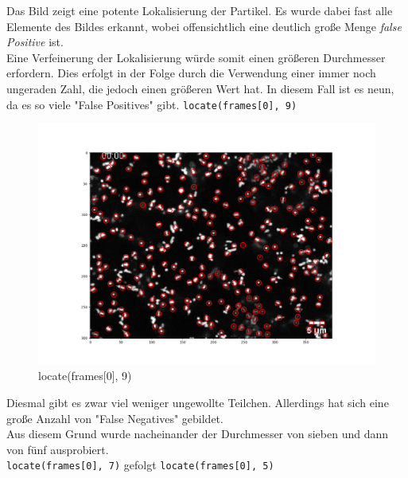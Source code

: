 \begin{enumerate}
Das Bild zeigt eine potente Lokalisierung der Partikel. Es wurde dabei fast alle Elemente des Bildes erkannt, wobei offensichtlich eine deutlich große Menge \textit{false Positive} ist. \\
Eine Verfeinerung der Lokalisierung würde somit einen größeren Durchmesser erfordern. Dies erfolgt in der Folge durch die Verwendung einer immer noch ungeraden Zahl, die jedoch einen größeren Wert hat. In diesem Fall ist es neun, da es so viele "False Positives" gibt. 
\texttt{locate(frames[0], 9)}

\begin{figure}[H]
    \centering
    \includegraphics[scale=0.35]{Grafiken/trackpyBilder/locate(frames[0], 9).png}
    \caption{locate(frames[0], 9)}
    \label{fig:bild_label}
\end{figure} 

Diesmal gibt es zwar viel weniger ungewollte Teilchen. Allerdings hat sich eine große Anzahl von "False Negatives" gebildet. \\
Aus diesem Grund wurde nacheinander der Durchmesser von sieben und dann von fünf ausprobiert.\\
\texttt{locate(frames[0], 7)}   gefolgt  \texttt{locate(frames[0], 5)}
\newpage


\end{enumerate}
